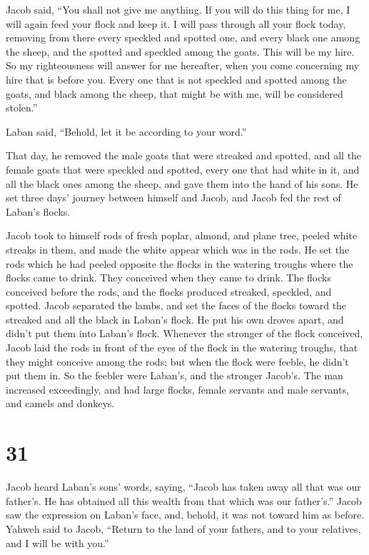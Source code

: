Jacob said, ``You shall not give me anything. If you will do this thing
for me, I will again feed your flock and keep it.  I will
pass through all your flock today, removing from there every speckled
and spotted one, and every black one among the sheep, and the spotted
and speckled among the goats. This will be my hire.  So my
righteousness will answer for me hereafter, when you come concerning my
hire that is before you. Every one that is not speckled and spotted
among the goats, and black among the sheep, that might be with me, will
be considered stolen.''

 Laban said, ``Behold, let it be according to your word.''

 That day, he removed the male goats that were streaked and
spotted, and all the female goats that were speckled and spotted, every
one that had white in it, and all the black ones among the sheep, and
gave them into the hand of his sons.  He set three days'
journey between himself and Jacob, and Jacob fed the rest of Laban's
flocks.

 Jacob took to himself rods of fresh poplar, almond, and
plane tree, peeled white streaks in them, and made the white appear
which was in the rods.  He set the rods which he had peeled
opposite the flocks in the watering troughs where the flocks came to
drink. They conceived when they came to drink.  The flocks
conceived before the rods, and the flocks produced streaked, speckled,
and spotted.  Jacob separated the lambs, and set the faces
of the flocks toward the streaked and all the black in Laban's flock. He
put his own droves apart, and didn't put them into Laban's flock.
 Whenever the stronger of the flock conceived, Jacob laid
the rods in front of the eyes of the flock in the watering troughs, that
they might conceive among the rods;  but when the flock
were feeble, he didn't put them in. So the feebler were Laban's, and the
stronger Jacob's.  The man increased exceedingly, and had
large flocks, female servants and male servants, and camels and donkeys.

\hypertarget{section-30}{%
\section{31}\label{section-30}}

 Jacob heard Laban's sons' words, saying, ``Jacob has taken
away all that was our father's. He has obtained all this wealth from
that which was our father's.''  Jacob saw the expression on
Laban's face, and, behold, it was not toward him as before. 
Yahweh said to Jacob, ``Return to the land of your fathers, and to your
relatives, and I will be with you.''

